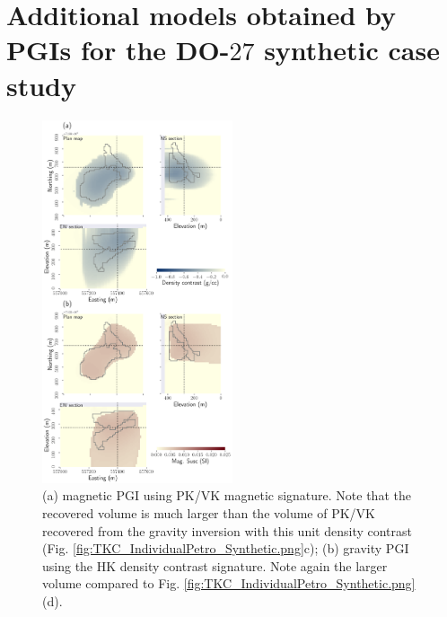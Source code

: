 \documentclass[extra, mreferee]{gji_joint} %
\begin{document}


\section{Additional models obtained by PGIs for the DO-$27$ synthetic case study} \label{sec:additionalIndividual}

\begin{figure}
\centering
\includegraphics[width=0.5\textwidth]{TKC_AdditionalIndividualPetro_FULL_Synthetic.png}
\caption{(a) magnetic PGI using PK/VK magnetic signature. Note that the recovered volume is much larger than the volume of PK/VK recovered from the gravity inversion with this unit density contrast (Fig. \ref{fig:TKC_IndividualPetro_Synthetic.png}c); (b) gravity PGI using the HK density contrast signature. Note again the larger volume compared to Fig. \ref{fig:TKC_IndividualPetro_Synthetic.png}(d).}
\label{fig:TKC_AdditionalIndividualPetro_FULL_Synthetic.png}
\end{figure}

\end{document}
